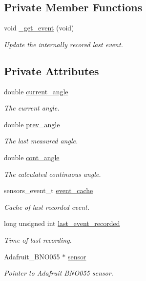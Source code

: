 \subsection*{Private Member Functions}
\begin{DoxyCompactItemize}
\item 
void \hyperlink{class_gyroscope_abd15bf5d98f1d4b6ee3aff051812972e}{\+\_\+get\+\_\+event} (void)
\begin{DoxyCompactList}\small\item\em Update the internally recored last event. \end{DoxyCompactList}\end{DoxyCompactItemize}
\subsection*{Private Attributes}
\begin{DoxyCompactItemize}
\item 
double \hyperlink{class_gyroscope_a6da1957aa183ed0f0aabc6cd1ad85bf1}{current\+\_\+angle}
\begin{DoxyCompactList}\small\item\em The current angle. \end{DoxyCompactList}\item 
double \hyperlink{class_gyroscope_a05294072cbb0e362975d3f0ad626b716}{prev\+\_\+angle}
\begin{DoxyCompactList}\small\item\em The last measured angle. \end{DoxyCompactList}\item 
double \hyperlink{class_gyroscope_a1ed017e1e0767f70dfda902b858e04bc}{cont\+\_\+angle}
\begin{DoxyCompactList}\small\item\em The calculated continuous angle. \end{DoxyCompactList}\item 
sensors\+\_\+event\+\_\+t \hyperlink{class_gyroscope_a6c8b9e319b379c2f1582afbe25e68c76}{event\+\_\+cache}
\begin{DoxyCompactList}\small\item\em Cache of last recorded event. \end{DoxyCompactList}\item 
long unsigned int \hyperlink{class_gyroscope_a8a6c3d747717b3bede6400c17a4696b6}{last\+\_\+event\+\_\+recorded}
\begin{DoxyCompactList}\small\item\em Time of last recording. \end{DoxyCompactList}\item 
Adafruit\+\_\+\+B\+N\+O055 $\ast$ \hyperlink{class_gyroscope_a7a8dacdbe6d1fcd8004fa62b0997e2bf}{sensor}
\begin{DoxyCompactList}\small\item\em Pointer to Adafruit B\+N\+O055 sensor. \end{DoxyCompactList}\end{DoxyCompactItemize}


